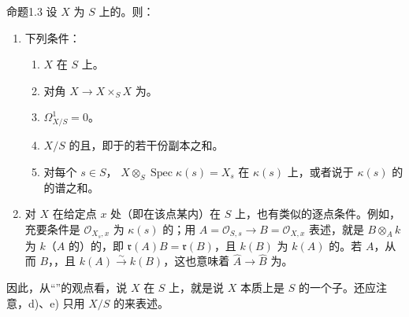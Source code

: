 \begin{SGAresult}{命题}{1.3}
设 $X$ 为 $S$ 上的。则：
\begin{enumerate}
\item[(i)] 下列条件：
\begin{enumerate}
\item[a)] $X$ 在 $S$ 上。
\item[b)] 对角 $X\to X\times_S X$ 为。
\item[c)] $\Omega^1_{X/S}=0$。
\item[d)] $X/S$ 的且，即于的若干份副本之和。
\item[e)] 对每个 $s\in S$， $X\otimes_S\operatorname{Spec}\kappa(s)=X_s$ 在 $\kappa(s)$ 上，或者说于 $\kappa(s)$ 的的谱之和。
\end{enumerate}
\item[(ii)] 对 $X$ 在给定点 $x$ 处（即在该点某内）在 $S$ 上，也有类似的逐点条件。例如，充要条件是 $\mathscr O_{X_s,x}$ 为 $\kappa(s)$ 的；用 $A=\mathscr O_{S,s}\to B=\mathscr O_{X,x}$ 表述，就是 $B\otimes_A k$ 为 $k$（$A$ 的）的，即 $\mathfrak r(A)B=\mathfrak r(B)$，且 $k(B)$ 为 $k(A)$ 的。若 $A$，从而 $B$，，且 $k(A)\xrightarrow\sim k(B)$，这也意味着 $\widehat A\to\widehat B$ 为。
\end{enumerate}
\end{SGAresult}
因此，从“”的观点看，说 $X$ 在 $S$ 上，就是说 $X$ 本质上是 $S$ 的一个子。还应注意，d)、e) 只用 $X/S$ 的来表述。
